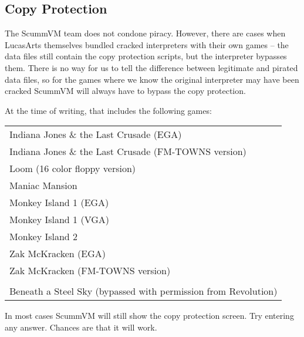 \subsection{Copy Protection}

The ScummVM team does not condone piracy. However, there are cases when
LucasArts themselves bundled cracked interpreters with their own games --
the data files still contain the copy protection scripts, but the interpreter
bypasses them. There is no way for us to tell the difference between legitimate
and pirated data files, so for the games where we know the original interpreter
may have been cracked ScummVM will always have to bypass the copy protection.

At the time of writing, that includes the following games:

\begin{tabular}{l}
Indiana Jones \& the Last Crusade (EGA)\\
Indiana Jones \& the Last Crusade (FM-TOWNS version)\\
Loom (16 color floppy version)\\
Maniac Mansion\\
Monkey Island 1 (EGA)\\
Monkey Island 1 (VGA)\\
Monkey Island 2\\
Zak McKracken (EGA)\\
Zak McKracken (FM-TOWNS version)\\
\\
Beneath a Steel Sky (bypassed with permission from Revolution)
\end{tabular}

In most cases ScummVM will still show the copy protection screen. Try entering
any answer. Chances are that it will work.

